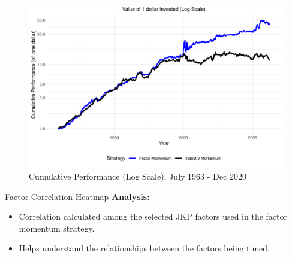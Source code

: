 \documentclass[t]{beamer}\usepackage[]{graphicx}\usepackage[table]{xcolor}
\makeatletter
\def\maxwidth{ %
  \ifdim\Gin@nat@width>\linewidth
    \linewidth
  \else
    \Gin@nat@width
  \fi
}
\newenvironment{knitrout}{}{} %
\makeatother
\begin{document}
\begin{frame}

\begin{knitrout}
\color{fgcolor}\begin{figure}

{\centering \includegraphics[width=\maxwidth]{figure/cum_ret_plot-1} 

}

\caption[Cumulative Performance (Log Scale), July 1963 - Dec 2020]{Cumulative Performance (Log Scale), July 1963 - Dec 2020}\label{fig:cum_ret_plot}
\end{figure}

\end{knitrout}

\end{frame}

\begin{frame}{Factor Correlation Heatmap}
\textbf{Analysis:}
\begin{itemize}
    \item Correlation calculated among the selected JKP factors used in the factor momentum strategy.
    \item Helps understand the relationships between the factors being timed.
\end{itemize}

\vspace{0.5cm} %
\end{frame}
\end{document}

